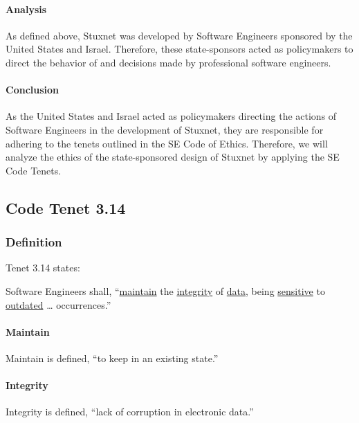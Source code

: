 \documentclass[12pt]{article}
\begin{document}
\begin{multicols}{2}
\paragraph{Analysis}

As defined above, Stuxnet was developed by Software Engineers sponsored by the United States and Israel. Therefore, these state-sponsors acted as policymakers to direct the behavior of and decisions made by professional software engineers.

\paragraph{Conclusion}

As the United States and Israel acted as policymakers directing the actions of Software Engineers in the development of Stuxnet, they are responsible for adhering to the tenets outlined in the SE Code of Ethics. Therefore, we will analyze the ethics of the state-sponsored design of Stuxnet by applying the SE Code Tenets.

\subsection{Code Tenet 3.14}

\subsubsection{Definition}

Tenet 3.14 states:

\begin{framed}
Software Engineers shall, ``\ul{maintain} the \ul{integrity} of \ul{data}, being \ul{sensitive} to \ul{outdated} … occurrences.''\cite{softwareEngineeringCodeOfEthics}
\end{framed}

\paragraph{Maintain}

Maintain is defined, ``to keep in an existing state.''\cite{merriamWebsterDefinitions}

\paragraph{Integrity}

Integrity is defined, ``lack of corruption in electronic data.''\cite{oxfordDictionary}


\end{multicols}
\end{document}
